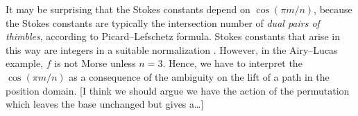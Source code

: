 \documentclass{article}
\newcommand{\laplace}{\mathcal{L}}
\theoremstyle{definition}
\theoremstyle{plain}
\newenvironment{todo}{\color{Coral}}{\color{black}}
\newenvironment{revised}{\color{DarkBlue}}{\color{black}}
\begin{document}
It may be surprising that the Stokes constants depend on $\cos(\pi m/n)$, because the Stokes constants are \begin{revised}typically\end{revised} the intersection number of \textit{dual pairs of thimbles}, according to Picard--Lefschetz formula. Stokes constants that arise in this way are integers in a suitable normalization \cite[Section 5]{pham}\cite[\begin{todo}Chapter~??\end{todo}]{Arnold}. However, in the Airy--Lucas example, $f$ is not Morse unless $n=3$. Hence, we have to interpret the $\cos(\pi m/n)$ as a consequence of the ambiguity on the lift of a path in the position domain. \begin{todo}[I think we should argue we have the action of the permutation which leaves the base unchanged but gives a\ldots]\end{todo}
%


%
\end{document}
